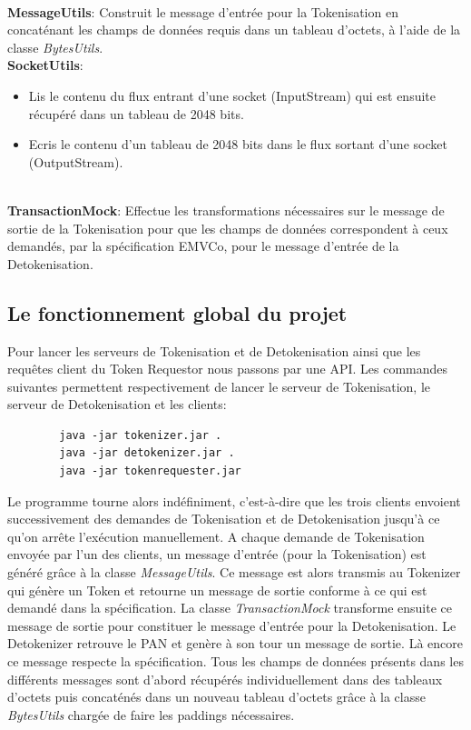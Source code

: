 \documentclass{report}
\begin{document}
~\\
\noindent
\textbf{MessageUtils}: Construit le message d'entrée pour la Tokenisation en concaténant les champs de données requis dans un tableau d'octets, à l'aide de la classe \textit{BytesUtils}.\\

\noindent
\textbf{SocketUtils}: 
\begin{itemize}
	\item Lis le contenu du flux entrant d'une socket (InputStream) qui est ensuite récupéré dans un tableau de 2048 bits.
	\item Ecris le contenu d'un tableau de 2048 bits dans le flux sortant d'une socket (OutputStream).
\end{itemize}

~\\
\noindent
\textbf{TransactionMock}: Effectue les transformations nécessaires sur le message de sortie de la Tokenisation pour que les champs de données correspondent à ceux demandés, par la spécification EMVCo, pour le message d'entrée de la Detokenisation.

\subsection{Le fonctionnement global du projet}
Pour lancer les serveurs de Tokenisation et de Detokenisation ainsi que les requêtes client du Token Requestor nous passons par une API. Les commandes suivantes permettent respectivement de lancer le serveur de Tokenisation, le serveur de Detokenisation et les clients:

\begin{center}
	\begin{lstlisting}
		java -jar tokenizer.jar .
		java -jar detokenizer.jar .
		java -jar tokenrequester.jar
	\end{lstlisting}
\end{center}

\noindent
Le programme tourne alors indéfiniment, c'est-à-dire que les trois clients envoient successivement des demandes de Tokenisation et de Detokenisation jusqu'à ce qu'on arrête l'exécution manuellement. A chaque demande de Tokenisation envoyée par l'un des clients, un message d'entrée (pour la Tokenisation) est généré grâce à la classe \textit{MessageUtils}. Ce message est alors transmis au Tokenizer qui génère un Token et retourne un message de sortie conforme à ce qui est demandé dans la spécification. La classe \textit{TransactionMock} transforme ensuite ce message de sortie pour constituer le message d'entrée pour la Detokenisation. Le Detokenizer retrouve le PAN et genère à son tour un message de sortie. Là encore ce message respecte la spécification. Tous les champs de données présents dans les différents messages sont d'abord récupérés individuellement dans des tableaux d'octets puis concaténés dans un nouveau tableau d'octets grâce à la classe \textit{BytesUtils} chargée de faire les paddings nécessaires.\\
\end{document}
